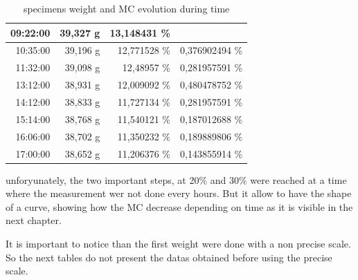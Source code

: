 \begin {table}[th]
\begin{tabular}{||r|r|r||r|}
	\hline
	\hline
	\rowcolor[rgb]{ .647,  .647,  .647} 09:22:00 & \multicolumn{1}{|r|}{\cellcolor[rgb]{ 1,  1,  1}39,327 g} & \cellcolor[rgb]{ 1,  1,  1}13,148431 \% & \multicolumn{1}{|r}{\cellcolor[rgb]{ 1,  1,  1}} \\
	\hline
	\hline
	10:35:00 & 39,196 g & 12,771528 \% & 0,376902494 \% \\
	\hline
	11:32:00 & 39,098 g & 12,48957 \% & 0,281957591 \% \\
	\hline
	13:12:00 & 38,931 g & 12,009092 \% & 0,480478752 \% \\
	\hline
	14:12:00 & 38,833 g & 11,727134 \% & 0,281957591 \% \\
	\hline
	15:14:00 & 38,768 g & 11,540121 \% & 0,187012688 \% \\
	\hline
	16:06:00 & 38,702 g & 11,350232 \% & 0,189889806 \% \\
	\hline
	17:00:00 & 38,652 g & 11,206376 \% & 0,143855914 \% \\
	\hline
\end{tabular}%
\caption[specimens weight and MC evolution E2O1]{specimens weight and MC evolution during time}
\label{tab:Tab4}
\end{table}
\newpage
unforyunately, the two important steps, at 20\% and 30\% were reached at a time where the measurement wer not done every hours. But it allow to have the shape of a curve, showing how the MC decrease depending on time as it is visible in the next chapter.

It is important to notice than the first weight were done with a non precise scale. So the next tables do not present the datas obtained before using the precise scale.


